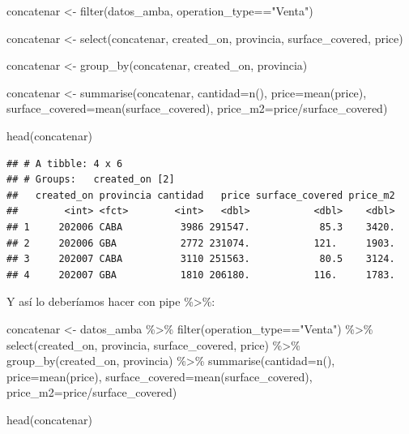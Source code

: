 \documentclass[
  spanish,
]{book}
\newenvironment{Shaded}{\begin{snugshade}}{\end{snugshade}}
\newcommand{\AttributeTok}[1]{\textcolor[rgb]{0.77,0.63,0.00}{#1}}
\newcommand{\FunctionTok}[1]{\textcolor[rgb]{0.00,0.00,0.00}{#1}}
\newcommand{\NormalTok}[1]{#1}
\newcommand{\OtherTok}[1]{\textcolor[rgb]{0.56,0.35,0.01}{#1}}
\newcommand{\SpecialCharTok}[1]{\textcolor[rgb]{0.00,0.00,0.00}{#1}}
\newcommand{\StringTok}[1]{\textcolor[rgb]{0.31,0.60,0.02}{#1}}
\begin{document}
\begin{Shaded}
\begin{Highlighting}[]
\NormalTok{concatenar }\OtherTok{\textless{}{-}} \FunctionTok{filter}\NormalTok{(datos\_amba, operation\_type}\SpecialCharTok{==}\StringTok{"Venta"}\NormalTok{)}

\NormalTok{concatenar }\OtherTok{\textless{}{-}} \FunctionTok{select}\NormalTok{(concatenar, created\_on, provincia, surface\_covered, price)}

\NormalTok{concatenar }\OtherTok{\textless{}{-}} \FunctionTok{group\_by}\NormalTok{(concatenar, created\_on, provincia)}

\NormalTok{concatenar }\OtherTok{\textless{}{-}} \FunctionTok{summarise}\NormalTok{(concatenar, }\AttributeTok{cantidad=}\FunctionTok{n}\NormalTok{(),}
                        \AttributeTok{price=}\FunctionTok{mean}\NormalTok{(price),}
                        \AttributeTok{surface\_covered=}\FunctionTok{mean}\NormalTok{(surface\_covered),}
                        \AttributeTok{price\_m2=}\NormalTok{price}\SpecialCharTok{/}\NormalTok{surface\_covered)}

\FunctionTok{head}\NormalTok{(concatenar)}
\end{Highlighting}
\end{Shaded}

\begin{verbatim}
## # A tibble: 4 x 6
## # Groups:   created_on [2]
##   created_on provincia cantidad   price surface_covered price_m2
##        <int> <fct>        <int>   <dbl>           <dbl>    <dbl>
## 1     202006 CABA          3986 291547.            85.3    3420.
## 2     202006 GBA           2772 231074.           121.     1903.
## 3     202007 CABA          3110 251563.            80.5    3124.
## 4     202007 GBA           1810 206180.           116.     1783.
\end{verbatim}

Y así lo deberíamos hacer con pipe \%\textgreater\%:

\begin{Shaded}
\begin{Highlighting}[]
\NormalTok{concatenar }\OtherTok{\textless{}{-}}\NormalTok{ datos\_amba }\SpecialCharTok{\%\textgreater{}\%}
  \FunctionTok{filter}\NormalTok{(operation\_type}\SpecialCharTok{==}\StringTok{"Venta"}\NormalTok{) }\SpecialCharTok{\%\textgreater{}\%}
  \FunctionTok{select}\NormalTok{(created\_on, provincia, surface\_covered, price) }\SpecialCharTok{\%\textgreater{}\%}
  \FunctionTok{group\_by}\NormalTok{(created\_on, provincia) }\SpecialCharTok{\%\textgreater{}\%}
  \FunctionTok{summarise}\NormalTok{(}\AttributeTok{cantidad=}\FunctionTok{n}\NormalTok{(),}
            \AttributeTok{price=}\FunctionTok{mean}\NormalTok{(price),}
            \AttributeTok{surface\_covered=}\FunctionTok{mean}\NormalTok{(surface\_covered),}
            \AttributeTok{price\_m2=}\NormalTok{price}\SpecialCharTok{/}\NormalTok{surface\_covered)}

\FunctionTok{head}\NormalTok{(concatenar)}
\end{Highlighting}
\end{Shaded}
\end{document}
